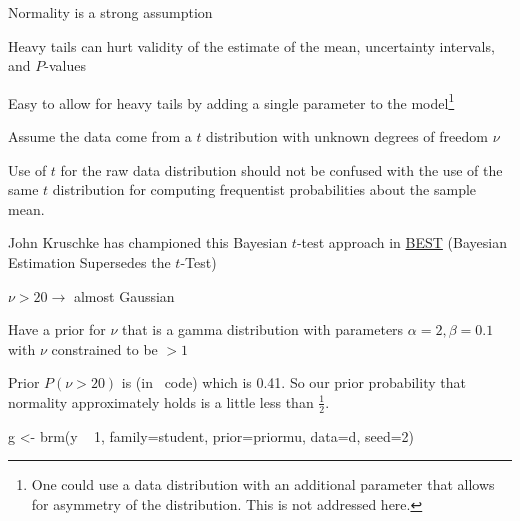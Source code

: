 \bi
\item Normality is a strong assumption
\item Heavy tails can hurt validity of the estimate of the mean,
  uncertainty intervals, and $P$-values
\item Easy to allow for heavy tails by adding a single parameter to
  the model\footnote{One could use a data distribution with an
    additional parameter that allows for asymmetry of the
    distribution.  This is not addressed here.}
\item Assume the data come from a $t$ distribution with unknown
  degrees of freedom $\nu$
  \bi
  \item Use of $t$ for the raw data distribution should not be
    confused with the use of the same $t$ distribution for computing
    frequentist probabilities about the sample mean.
  \item John Kruschke has championed this Bayesian $t$-test approach
    in
    \href{https://cran.r-project.org/web/packages/BEST/vignettes/BEST.pdf}{BEST}
    (Bayesian Estimation Supersedes the $t$-Test)
  \ei
\item $\nu > 20 \rightarrow$ almost Gaussian
\item Have a prior for $\nu$ that is a gamma distribution with
  parameters $\alpha=2, \beta=0.1$ with $\nu$ constrained to be $> 1$
\item Prior $P(\nu > 20)$ is (in \R\ code)
   which is
  0.41.  So our prior
  probability that normality approximately holds is a little less than
  $\frac{1}{2}$. 
\ei

\begin{Schunk}
\begin{Sinput}
g <- brm(y ~ 1, family=student, prior=priormu, data=d, seed=2)
\end{Sinput}
\end{Schunk}

